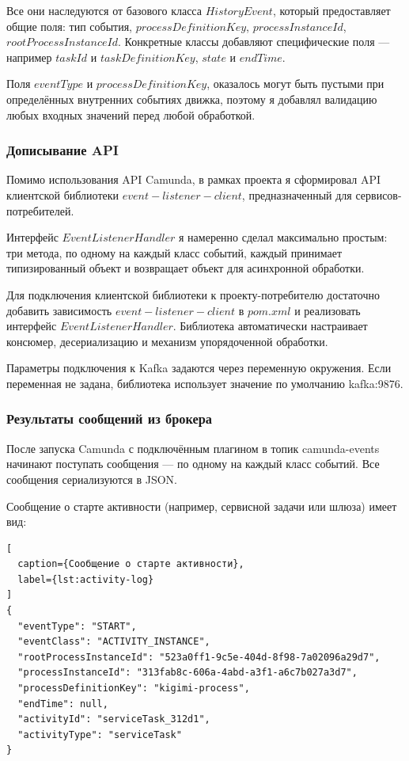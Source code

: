 Все они наследуются от базового класса $HistoryEvent$, который    
предоставляет общие поля: тип события,           
$processDefinitionKey$, $processInstanceId$, $rootProcessInstanceId$.        
Конкретные классы добавляют специфические поля — например $taskId$ и
$taskDefinitionKey$, $state$ и $endTime$.

Поля $eventType$ и     
$processDefinitionKey$, оказалось могут быть пустыми при определённых внутренних
событиях движка, поэтому я добавлял валидацию любых входных значений перед любой обработкой.

\subsubsection{Дописывание API}

Помимо использования API Camunda, в рамках проекта я сформировал
API клиентской библиотеки $event-listener-client$, 
предназначенный для сервисов-потребителей.
                                                                        
Интерфейс $EventListenerHandler$ я намеренно сделал максимально
простым: три метода, по одному на каждый класс событий, каждый         
принимает типизированный объект и возвращает объект для асинхронной обработки.

Для подключения клиентской библиотеки к проекту-потребителю достаточно 
добавить зависимость $event-listener-client$ в $pom.xml$ и реализовать
интерфейс $EventListenerHandler$. Библиотека         
автоматически настраивает консюмер, десериализацию и механизм
упорядоченной обработки.

Параметры подключения к Kafka задаются через переменную окружения. 
Если переменная не задана, библиотека
использует значение по умолчанию kafka:9876.

\subsubsection{Результаты сообщений из брокера}

После запуска Camunda с подключённым плагином в топик camunda-events
начинают поступать сообщения — по одному на каждый класс    
событий. Все сообщения сериализуются в JSON.
                                                                        
Сообщение о старте активности (например, сервисной задачи или шлюза)   
имеет вид:

\begin{lstlisting}[
  caption={Сообщение о старте активности},
  label={lst:activity-log}
]
{               
  "eventType": "START",
  "eventClass": "ACTIVITY_INSTANCE",
  "rootProcessInstanceId": "523a0ff1-9c5e-404d-8f98-7a02096a29d7",
  "processInstanceId": "313fab8c-606a-4abd-a3f1-a6c7b027a3d7",                                 
  "processDefinitionKey": "kigimi-process",
  "endTime": null,                                                     
  "activityId": "serviceTask_312d1",
  "activityType": "serviceTask"                                        
}
\end{lstlisting}
                                                                                                                                   
